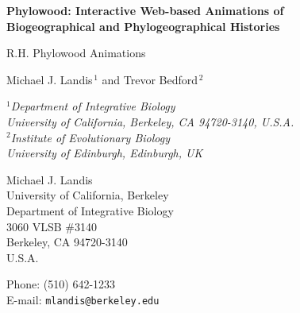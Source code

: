 \documentclass[11pt]{article}
\begin{document}


\begin{titlepage}
\begin{center}
{\Large\bf Phylowood: Interactive Web-based Animations of\\Biogeographical and Phylogeographical Histories}

\vfill

R.H. Phylowood Animations

\vfill

{\sc Michael J. Landis$^{\,1}$ and Trevor Bedford$^{\,2}$} \\

\bigskip

{\em
$\mbox{}^1$Department of Integrative Biology\\
\vspace{-0.4\baselineskip}
University of California, Berkeley, CA 94720-3140, \mbox{U.S.A.} \\

$\mbox{}^2$Institute of Evolutionary Biology\\
\vspace{-0.4\baselineskip}
University of Edinburgh, Edinburgh, UK \\
}
\end{center}

\vfill

\begin{flushleft}
Michael J. Landis \\
\vspace{-0.4\baselineskip}
University of California, Berkeley \\ 
\vspace{-0.4\baselineskip}
Department of Integrative Biology \\
\vspace{-0.4\baselineskip}
3060 VLSB \#3140 \\
\vspace{-0.4\baselineskip}
Berkeley, CA 94720-3140 \\
\vspace{-0.4\baselineskip}
\mbox{U.S.A.}

Phone: (510) 642-1233 \\
\vspace{-0.4\baselineskip}
E-mail: {\tt mlandis@berkeley.edu} \\
\end{flushleft}

\end{titlepage}
\end{document}
